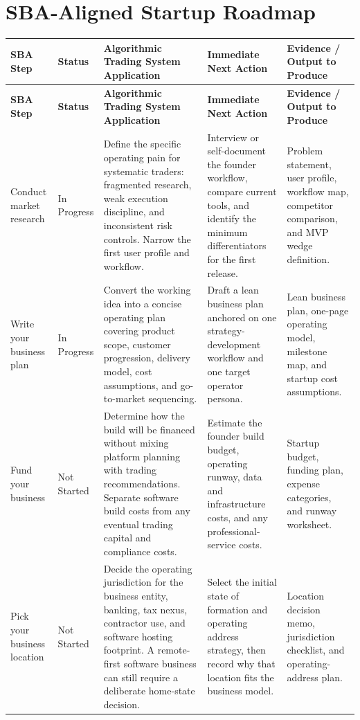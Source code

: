 \documentclass[11pt]{article}
\newcommand{\statusprogress}{In Progress}
\newcommand{\statusnotstarted}{Not Started}
\begin{document}
\section*{SBA-Aligned Startup Roadmap}
{\footnotesize
{}
\begin{longtable}{@{}>{\RaggedRight\arraybackslash}p{}>{\RaggedRight\arraybackslash}p{}>{\RaggedRight\arraybackslash}p{}>{\RaggedRight\arraybackslash}p{}>{\RaggedRight\arraybackslash}p{}@{}}
\rowcolor{gray!20}
\textbf{SBA Step} & \textbf{Status} & \textbf{Algorithmic Trading System Application} & \textbf{Immediate Next Action} & \textbf{Evidence / Output to Produce} \\
\endfirsthead
\rowcolor{gray!20}
\textbf{SBA Step} & \textbf{Status} & \textbf{Algorithmic Trading System Application} & \textbf{Immediate Next Action} & \textbf{Evidence / Output to Produce} \\
\endhead
Conduct market research & \statusprogress & Define the specific operating pain for systematic traders: fragmented research, weak execution discipline, and inconsistent risk controls. Narrow the first user profile and workflow. & Interview or self-document the founder workflow, compare current tools, and identify the minimum differentiators for the first release. & Problem statement, user profile, workflow map, competitor comparison, and MVP wedge definition. \\
Write your business plan & \statusprogress & Convert the working idea into a concise operating plan covering product scope, customer progression, delivery model, cost assumptions, and go-to-market sequencing. & Draft a lean business plan anchored on one strategy-development workflow and one target operator persona. & Lean business plan, one-page operating model, milestone map, and startup cost assumptions. \\
Fund your business & \statusnotstarted & Determine how the build will be financed without mixing platform planning with trading recommendations. Separate software build costs from any eventual trading capital and compliance costs. & Estimate the founder build budget, operating runway, data and infrastructure costs, and any professional-service costs. & Startup budget, funding plan, expense categories, and runway worksheet. \\
Pick your business location & \statusnotstarted & Decide the operating jurisdiction for the business entity, banking, tax nexus, contractor use, and software hosting footprint. A remote-first software business can still require a deliberate home-state decision. & Select the initial state of formation and operating address strategy, then record why that location fits the business model. & Location decision memo, jurisdiction checklist, and operating-address plan. \\

\end{longtable}}
\end{document}
